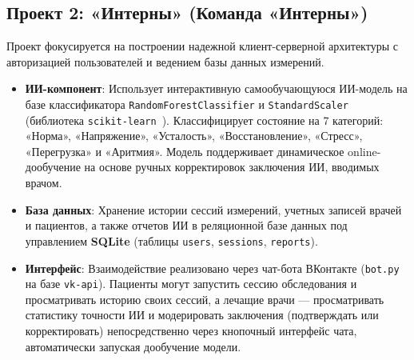 \documentclass[utf8, russian]{eskdtext}
\begin{document}
\subsection{Проект 2: «Интерны» (Команда «Интерны»)}
Проект фокусируется на построении надежной клиент-серверной архитектуры с авторизацией пользователей и ведением базы данных измерений.
\begin{itemize}
    \item \textbf{ИИ-компонент}: Использует интерактивную самообучающуюся ИИ-модель на базе классификатора \texttt{RandomForestClassifier} и \texttt{StandardScaler} (библиотека \texttt{scikit-learn}~\cite{sklearn_docs}). Классифицирует состояние на 7 категорий: «Норма», «Напряжение», «Усталость», «Восстановление», «Стресс», «Перегрузка» и «Аритмия». Модель поддерживает динамическое online-дообучение на основе ручных корректировок заключения ИИ, вводимых врачом.
    \item \textbf{База данных}: Хранение истории сессий измерений, учетных записей врачей и пациентов, а также отчетов ИИ в реляционной базе данных под управлением \textbf{SQLite} (таблицы \texttt{users}, \texttt{sessions}, \texttt{reports}).
    \item \textbf{Интерфейс}: Взаимодействие реализовано через чат-бота ВКонтакте (\texttt{bot.py} на базе \texttt{vk-api}). Пациенты могут запустить сессию обследования и просматривать историю своих сессий, а лечащие врачи — просматривать статистику точности ИИ и модерировать заключения (подтверждать или корректировать) непосредственно через кнопочный интерфейс чата, автоматически запуская дообучение модели.
\end{itemize}
\end{document}
